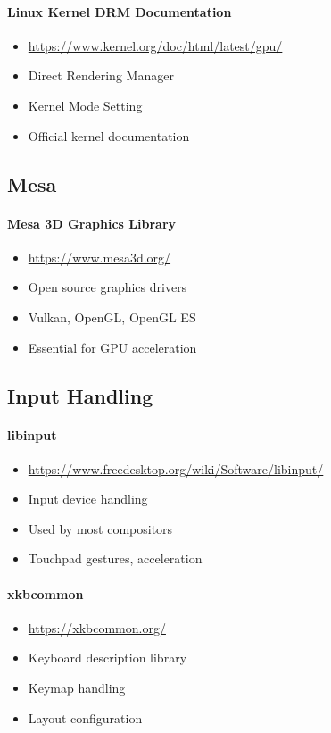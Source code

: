 \paragraph{Linux Kernel DRM Documentation}
\begin{itemize}
    \item \url{https://www.kernel.org/doc/html/latest/gpu/}
    \item Direct Rendering Manager
    \item Kernel Mode Setting
    \item Official kernel documentation
\end{itemize}

\subsection{Mesa}

\paragraph{Mesa 3D Graphics Library}
\begin{itemize}
    \item \url{https://www.mesa3d.org/}
    \item Open source graphics drivers
    \item Vulkan, OpenGL, OpenGL ES
    \item Essential for GPU acceleration
\end{itemize}

\subsection{Input Handling}

\paragraph{libinput}
\begin{itemize}
    \item \url{https://www.freedesktop.org/wiki/Software/libinput/}
    \item Input device handling
    \item Used by most compositors
    \item Touchpad gestures, acceleration
\end{itemize}

\paragraph{xkbcommon}
\begin{itemize}
    \item \url{https://xkbcommon.org/}
    \item Keyboard description library
    \item Keymap handling
    \item Layout configuration
\end{itemize}

